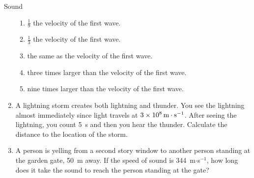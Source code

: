 \begin{eocexercises}{Sound}
\begin{enumerate}[noitemsep, label=\textbf{\arabic*}. ]
\label{m38800*id187073}\begin{enumerate}[noitemsep, label=\textbf{\alph*}. ] 
            \label{m38800*uid83}\item $\frac{1}{9}$ the velocity of the first wave.
\label{m38800*uid84}\item $\frac{1}{3}$ the velocity of the first wave.
\label{m38800*uid85}\item the same as the velocity of the first wave.
\label{m38800*uid86}\item three times larger than the velocity of the first wave.
\label{m38800*uid87}\item nine times larger than the velocity of the first wave.
\end{enumerate}
                \label{m38800*uid91}\item A lightning storm creates both lightning and thunder. You see the lightning almost immediately since light travels at $3\ensuremath{\times}{10}^{8}\phantom{\rule{0.166667em}{0ex}}\text{m}\ensuremath{\cdot}{\text{s}}^{-1}$. After seeing the lightning, you count 5~s and then you hear the thunder. Calculate the distance to the location of the storm.\newline
\label{m38800*uid92}\item A person is yelling from a second story window to another person standing at the garden gate, 50~m away. If the speed of sound is 344~m$\ensuremath{\cdot}$s${}^{-1}$, how long does it take the sound to reach the person standing at the gate?\newline

\end{enumerate}
\end{eocexercises}
